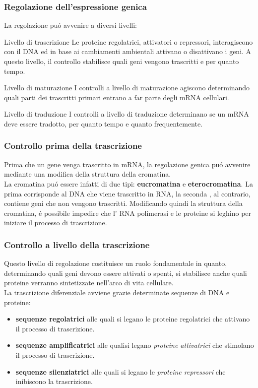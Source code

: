 \documentclass[hyperref={pdfpagelabels=false}]{beamer}
\begin{document}
\begin{frame}\frametitle{Regolazione dell'espressione genica}
La regolazione pu\'o avvenire a diversi livelli:
\begin{block}{Livello di trascrizione}
Le proteine regolatrici, attivatori o repressori, interagiscono con il DNA ed in base ai cambiamenti ambientali attivano o disattivano i geni. A questo livello, il controllo stabilisce quali geni vengono trascritti e per quanto tempo.
\end{block}
\begin{block}{Livello di maturazione}
I controlli a livello di maturazione agiscono determinando quali parti dei trascritti primari entrano a far parte degli mRNA cellulari.
\end{block}
\begin{block}{Livello di traduzione}
I controlli a livello di traduzione determinano se un mRNA deve essere tradotto, per quanto tempo e quanto frequentemente.
\end{block}
\end{frame}


\begin{frame}\frametitle{Controllo prima della trascrizione}
 Prima che un gene venga trascritto in mRNA, la regolazione genica pu\'o avvenire mediante una modifica della struttura della cromatina.\\
 La cromatina pu\'o essere infatti di due tipi: \textbf{eucromatina} e \textbf{eterocromatina}. La prima corrisponde al DNA che viene trascritto in RNA, la seconda , al contrario, contiene geni che non vengono trascritti.
 Modificando quindi la struttura della cromatina, \'e possibile impedire che l' RNA polimerasi e le proteine si leghino per iniziare il processo di trascrizione.
\end{frame}


\begin{frame} \frametitle{Controllo a livello della trascrizione}
Questo livello di regolazione costituisce un ruolo fondamentale in quanto, determinando quali geni devono essere attivati o spenti, si stabilisce anche quali proteine verranno sintetizzate nell'arco di vita cellulare.\\
La trascrizione diferenziale avviene grazie determinate sequenze di DNA e proteine:
\begin{itemize}
\item \textbf{sequenze regolatrici} alle quali si legano le proteine regolatrici che attivano il processo di trascrizione.
\item \textbf{sequenze amplificatrici} alle qualisi legano \emph{proteine attivatrici} che stimolano il processo di trascrizione.
\item \textbf{sequenze silenziatrici} alle quali si legano le \emph{proteine repressori} che inibiscono la trascrizione.
\end{itemize}
\end{frame}
\end{document}
